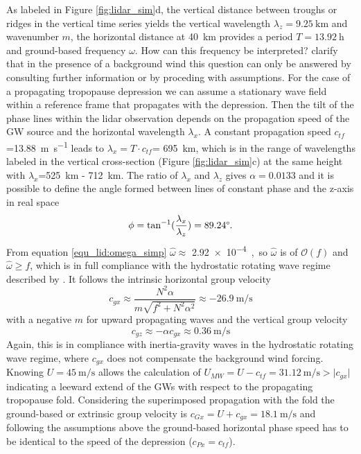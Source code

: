 As labeled in Figure \ref{fig:lidar_sim}d, the vertical distance between troughs or ridges in the vertical time series yields the vertical wavelength $\lambda_z=\SI{9.25}{\kilo \meter}$ and wavenumber $m$, the horizontal distance at \SI{40}{\kilo \meter} provides a period $T=\SI{13.92}{\hour}$ and ground-based frequency $\omega$. How can this frequency be interpreted? \textcite[]{dornbrack_interpretation_2017} clarify that in the presence of a background wind this question can only be answered by consulting further information or by proceding with assumptions. For the case of a propagating tropopause depression we can assume a stationary wave field within a reference frame that propagates with the depression. Then the tilt of the phase lines within the lidar observation depends on the propagation speed of the GW source and the horizontal wavelength $\lambda_x$. A constant propagation speed $c_{tf}$=\SI{13.88}{\meter \per \second} leads to $\lambda_x = T \cdot c_{tf}$= \SI{695}{\kilo \meter}, which is in the range of wavelengths labeled in the vertical cross-section (Figure \ref{fig:lidar_sim}c) at the same height with $\lambda_x$=\SI{525}{\kilo \meter} - \SI{712}{\kilo \meter}. The ratio of $\lambda_x$ and $\lambda_z$ gives $\alpha=0.0133$ and it is possible to define the angle formed between lines of constant phase and the z-axis in real space
\begin{equation}
    \phi = \tan^{-1}(\frac{\lambda_x}{\lambda_z})=89.24\degree.
    \label{equ_lid:phi}
\end{equation}
From equation \ref{equ_lid:omega_simp} $\hat{\omega}\approx$ \SI{2.92e-4}, so $\hat{\omega}$ is of $\mathcal{O}(f)$ and $\hat{\omega} \geq f$, which is in full compliance with the hydrostatic rotating wave regime described by \textcite[]{gill_atmosphere-ocean_1982}. It follows the intrinsic horizontal group velocity
\begin{equation}
    c_{gx} \approx \frac{N^2 \alpha}{m \sqrt{f^2+N^2 \alpha^2}} \approx \SI{-26.9}{\meter\per\second} 
    \label{equ_lid:cgh}
\end{equation}
with a negative $m$ for upward propagating waves and the vertical group velocity
\begin{equation}
    c_{gz} \approx -\alpha c_{gx} \approx \SI{0.36}{\meter\per\second}
    \label{equ_lid:cgz}
\end{equation}
Again, this is in compliance with inertia-gravity waves in the hydrostatic rotating wave regime, where $c_{gx}$ does not compensate the background wind forcing. Knowing $U=\SI{45}{\meter\per\second}$ allows the calculation of $U_{MW}=U-c_{tf}=\SI{31.12}{\meter\per\second}>\lvert c_{gx} \rvert$ indicating a leeward extend of the GWs with respect to the propagating tropopause fold. Considering the superimposed propagation with the fold the ground-based or extrinsic group velocity is $c_{Gx}=U+c_{gx}=\SI{18.1}{\meter\per\second}$ and following the assumptions above the ground-based horizontal phase speed has to be identical to the speed of the depression ($c_{Px} = c_{tf}$). \\
